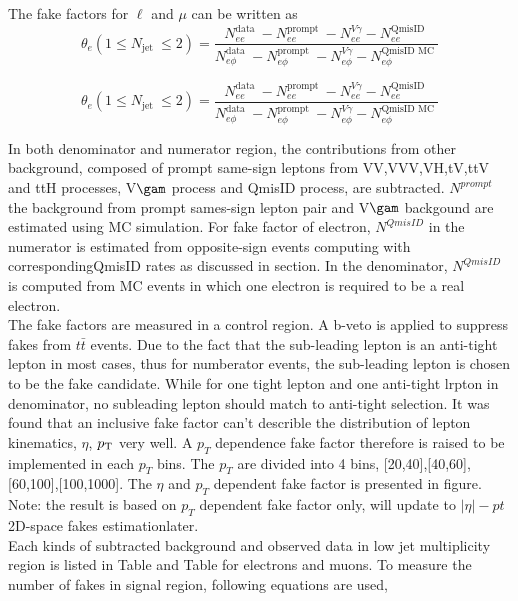 The fake factors for $\ell$ and $\mu$ can be written as 
\begin{equation}
\theta_{e}\left(1 \leq N_{\text {jet }} \leq 2\right)=\frac{N_{e e}^{\text {data }}-N_{e e}^{\text {prompt }}-N_{e e}^{V \gamma}-N_{e e}^{\text {QmisID }}}{N_{e \phi}^{\text {data }}-N_{e \phi}^{\text {prompt }}-N_{e \phi}^{V \gamma}-N_{e \phi}^{\text {QmisID MC }}}
\end{equation}

\begin{equation}
\theta_{e}\left(1 \leq N_{\text {jet }} \leq 2\right)=\frac{N_{e e}^{\text {data }}-N_{e e}^{\text {prompt }}-N_{e e}^{V \gamma}-N_{e e}^{\text {QmisID }}}{N_{e \phi}^{\text {data }}-N_{e \phi}^{\text {prompt }}-N_{e \phi}^{V \gamma}-N_{e \phi}^{\text {QmisID MC }}}
\end{equation}

In both denominator and numerator region, the contributions from other background, composed of prompt same-sign leptons from VV,VVV,VH,tV,ttV and ttH processes, V$\gam$ process and QmisID process, are subtracted. $N^{prompt}$ the  background from prompt sames-sign lepton pair and V$\gam$ backgound are estimated using MC simulation. For fake factor of electron, $N^{QmisID}$ in the numerator is estimated from opposite-sign events computing with correspondingQmisID rates as discussed in section. In the denominator, $N^{QmisID}$ is computed from MC events in which one electron is required to be a real electron.\\

The fake factors are measured in a control region. A b-veto is applied to suppress fakes from $t\bar{t}$ events. Due to the fact that the sub-leading lepton is an anti-tight lepton in most cases, thus for numberator events, the sub-leading lepton is chosen to be the fake candidate. While for one tight lepton and one anti-tight lrpton in denominator, no subleading lepton should match to anti-tight selection. It was found that an inclusive fake factor can't describle the distribution of lepton kinematics, $\eta$, $p_{\mathrm{T}}$ very well. A $p_T$ dependence fake factor therefore is raised to be implemented in each $p_T$ bins. The $p_T$ are divided into 4 bins, [20,40],[40,60],[60,100],[100,1000]. The $\eta$ and $p_T$ dependent fake factor is presented in figure.\\

Note: the result is based on $p_T$ dependent fake factor only, will update to $|\eta|-pt$ 2D-space fakes estimationlater.\\
Each kinds of subtracted background and observed data in low jet multiplicity region is listed in Table and Table for electrons and muons. To measure the number of fakes in signal region, following equations are used,


